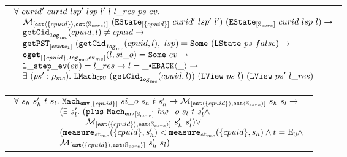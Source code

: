 \begin{hypothesis}
\begin{tabular}{P{0.95\textwidth}}
$
\begin{array}{l}
\forall \ curid' \ curid \ lsp' \ lsp \ l' \ l \ l\_res \ ps \ ev  . \\
\ \ \ \matchestateestate{\set{cpuid}}{(\envstate{\set{cpuid}}{curid'}{lsp'}{l'})}{(\envstate{\coreset}{curid}{lsp}{l})} \rightarrow\\
\ \ \ \getcuridfromlognoeq{cpuid}{l} \neq cpuid \rightarrow \\
\ \ \ \getpstsome{\localstatekwd}{\getcuridfromlognoeq{cpuid}{l}}{lsp}{(\localstate{ps}{false})} \rightarrow \\
\ \ \ \oget{\set{cpuid}}{\mclog}{\mcevent}{l}{si\_o}{ev} \rightarrow \\
\ \ \ \localstepev{ev}{l\_res} \rightarrow l = \listconsoppo{\yieldbackev{\_}}{\_} \rightarrow \\
\ \ \ \exists\ (ps' : \privatestate) . \ \hardwarelocalstep{(\getcuridfromlognoeq{cpuid}{l})}{(\localview{ps}{l})}{(\localview{ps'}{l\_res})} \\
\end{array}
$
\end{tabular}
\end{hypothesis}



\begin{lemma}
\begin{tabular}{P{0.95\textwidth}}
$
\begin{array}{l}
\forall \ s_h \ s_h' \ t \ s_l. \ \envstep{\set{cpuid}}{si\_o}{s_h}{t}{s_h'} \rightarrow  \matchestateestate{\set{cpuid}}{s_h}{s_l} \rightarrow \\
\ \ \ \ \ \ \ \ \ \ \ \ \ \ \ \ (\exists \ s_l' .\ (\ccplusstep{\envstep{\coreset}{hw\_o}{s_l}{t}{s_l'}} \wedge\\
\ \ \ \ \ \ \ \ \ \ \ \ \ \ \ \ \ \ \ \ \ \ \ \ \  \matchestateestate{\set{cpuid}}{s_h'}{s_l'}) \vee \\ 
\ \ \ \ \ \ \ \ \ \ \ \ \ \ \ \ (\mcstatemeasurenoeq{\set{cpuid}}{s_h'} < \mcstatemeasurenoeq{\set{cpuid}}{s_h} \wedge t = \ccemptytrace \wedge \\ 
\ \ \ \ \ \ \ \ \ \ \ \ \ \ \ \ \matchestateestate{\set{cpuid}}{s_h'}{s_l})\\
\end{array}
$
\end{tabular}
\end{lemma}

